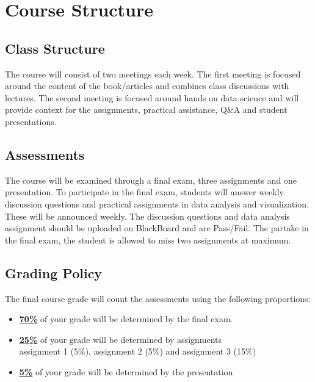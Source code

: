 \documentclass[11pt]{article}
\begin{document}

\section*{Course Structure}

\subsection*{Class Structure}

The course will consist of two meetings each week. The first meeting is focused around the content of the book/articles and combines class discussions with lectures. The second meeting is focused around hands on data science and will provide context for the assignments, practical assistance, Q\&A and student presentations.

\subsection*{Assessments}

The course will be examined through a final exam, three assignments and one presentation. To participate in the final exam, students will answer weekly discussion questions and practical assignments in data analysis and visualization. These will be announced weekly. The discussion questions and data analysis assignment should be uploaded on BlackBoard and are Pass/Fail. The partake in the final exam, the student is allowed to miss two assignments at maximum.



\subsection*{Grading Policy}
The final course grade will count the assessments using the following proportions:
\begin{itemize}
	\item \underline{\textbf{70\%}} of your grade will be determined by the final exam.
	\item \underline{\textbf{25\%}} of your grade will be determined by assignments \\
	assignment 1 (5\%), assignment 2 (5\%) and assignment 3 (15\%)
	\item \underline{\textbf{5\%}} of your grade will be determined by the presentation

\end{itemize}
\end{document}
